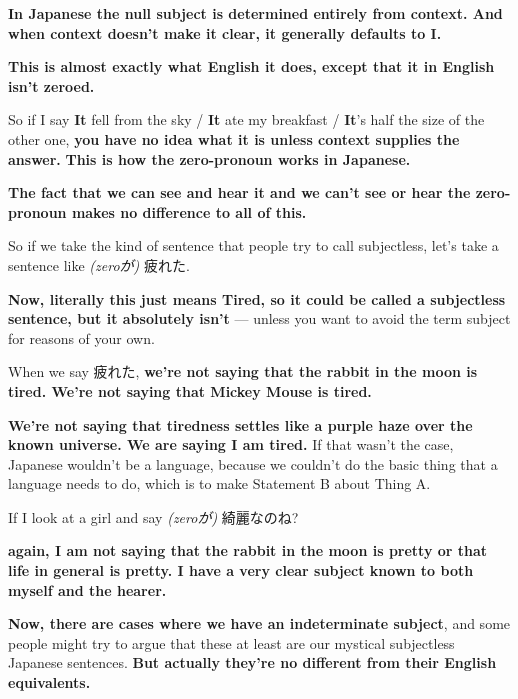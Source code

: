 {\bf In Japanese the null subject is determined entirely from context. And when context doesn't make it clear, it generally defaults to I.}

\thinrule

{\bf This is almost exactly what English it does, except that it in English isn't zeroed.}

{}

So if I say {\bf It} fell from the sky / {\bf It} ate my breakfast / {\bf It}'s half the size of the other one, {\bf you have no idea what it is unless context supplies the answer.}\crlf
{\bf This is how the zero-pronoun works in Japanese.}

{\bf The fact that we can see and hear it and we can't see or hear the zero-pronoun makes no difference to all of this.}

So if we take the kind of sentence that people try to call subjectless, let's take a sentence like {\em (zeroが)} 疲れた.

{}

{\bf Now, literally this just means Tired, so it could be called a subjectless sentence, but it absolutely isn't} --- unless you want to avoid the term subject for reasons of your own.

When we say 疲れた, {\bf we're not saying that the rabbit in the moon is tired. We're not saying that Mickey Mouse is tired.}

{\bf We're not saying that tiredness settles like a purple haze over the known universe. We are saying I am tired.} If that wasn't the case, Japanese wouldn't be a language, because we couldn't do the basic thing that a language needs to do, which is to make Statement B about Thing A.

If I look at a girl and say {\em (zeroが)} 綺麗なのね?

{}

{\bf again, I am not saying that the rabbit in the moon is pretty or that life in general is pretty. I have a very clear subject known to both myself and the hearer.}

\stopsectionlevel

\startsectionlevel[title={Indeterminate Subject},reference={indeterminate-subject}]

{\bf Now, there are cases where we have an indeterminate subject}, and some people might try to argue that these at least are our mystical subjectless Japanese sentences. {\bf But actually they're no different from their English equivalents.}

